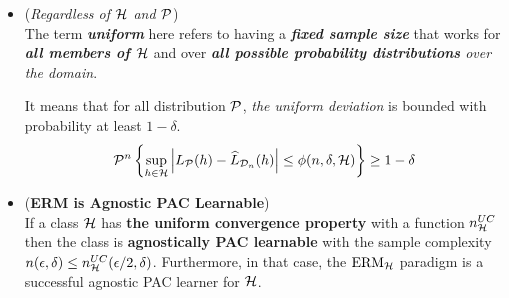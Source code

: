 \documentclass[11pt]{article}
\begin{document}
\begin{itemize}
\item \begin{remark}(\emph{Regardless of ${\mathcal H}$ and ${\mathcal P}$}) \\
The term \emph{\textbf{uniform}} here refers to having a \emph{\textbf{fixed sample size}} that works for \emph{\textbf{all members of ${\mathcal H}$}} and over \emph{\textbf{all possible probability distributions} over the domain}.

It means that for all distribution ${\mathcal P}$,  \emph{the uniform deviation} is bounded with  probability at least $1 - \delta$.
\begin{align*}
{\mathcal P}^n\left\{\sup_{h\in {\mathcal H}}\left\lvert L_{{\mathcal P}}(h) - \widehat{L}_{{\mathcal D}_n}(h) \right\rvert \le \phi(n, \delta, {\mathcal H})\right\} \ge 1 - \delta
\end{align*}
\end{remark}

\item \begin{corollary} (\textbf{ERM is Agnostic PAC Learnable}) \citep{shalev2014understanding}\\
If a class ${\mathcal H}$ has \textbf{the uniform convergence property} with a function $n^{UC}_{{\mathcal H}}$ then the class is \textbf{agnostically PAC learnable} with the sample complexity $n(\epsilon, \delta) \le n^{UC}_{{\mathcal H}}(\epsilon/2, \delta)$. Furthermore, in that case, the $\text{ERM}_{{\mathcal H}}$ paradigm is a successful agnostic PAC learner for ${\mathcal H}$.
\end{corollary}
\end{itemize}
\end{document}
